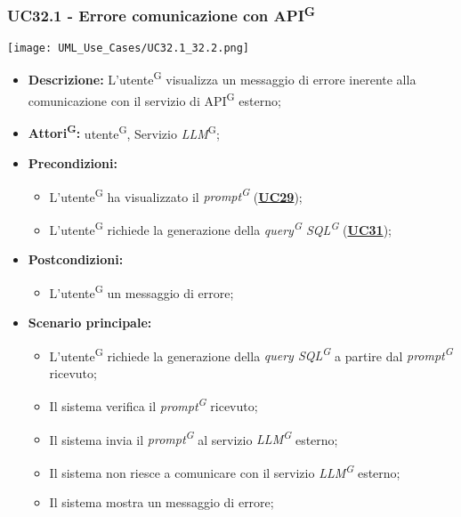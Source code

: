 \subsubsection{UC32.1 - Errore comunicazione con API\textsuperscript{G}}
\label{sec:UC32.1}
\texttt{[image: UML\_Use\_Cases/UC32.1\_32.2.png]}
\begin{itemize}
	\item \textbf{Descrizione:} L'utente\textsuperscript{G} visualizza un messaggio di errore inerente alla comunicazione con il servizio di API\textsuperscript{G} esterno;
	\item \textbf{Attori\textsuperscript{G}:} utente\textsuperscript{G}, Servizio \textit{LLM}\textsuperscript{G};
	\item \textbf{Precondizioni:} 
	\begin{itemize}
		\item L'utente\textsuperscript{G} ha visualizzato il \textit{prompt\textsuperscript{G}} (\hyperref[sec:UC29]{\textbf{UC29}});
		\item L'utente\textsuperscript{G} richiede la generazione della \textit{query\textsuperscript{G} SQL\textsuperscript{G}} (\hyperref[sec:UC31]{\textbf{UC31}});
	\end{itemize}
	\item \textbf{Postcondizioni:} 
	\begin{itemize}
		\item L'utente\textsuperscript{G} un messaggio di errore;
	\end{itemize}
	\item \textbf{Scenario principale:}
	\begin{itemize}
		\item L'utente\textsuperscript{G} richiede la generazione della \textit{query SQL\textsuperscript{G}} a partire dal \textit{prompt\textsuperscript{G}} ricevuto;
		\item Il sistema verifica il \textit{prompt\textsuperscript{G}} ricevuto;
		\item Il sistema invia il \textit{prompt\textsuperscript{G}} al servizio \textit{LLM\textsuperscript{G}} esterno;
		\item Il sistema non riesce a comunicare con il servizio \textit{LLM\textsuperscript{G}} esterno;
		\item Il sistema mostra un messaggio di errore;
	\end{itemize}
\end{itemize}

